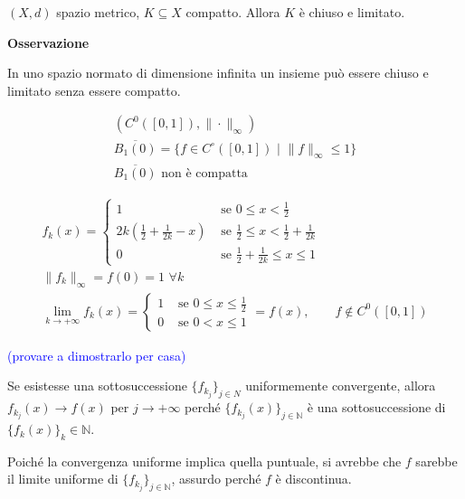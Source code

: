 \begin{theorem}
	\label{th: pag 221}
	$(X,d)$ spazio metrico, $K \subseteq X$ compatto. Allora $K$ è chiuso e limitato.
\end{theorem}
	
	
\textbf{Osservazione}

In uno spazio normato di dimensione infinita un insieme può essere chiuso e limitato senza essere compatto.

\begin{gather*} 
	(C^0([0,1]),\|\cdot\|_\infty)
	\\
	\overline{B_1(0)}=\{f\in C^\circ ([0,1])\,\, \big|\,\, \|f\|_\infty\leq 1\}
	\\
	\overline{B_1(0)} \text{ non è compatta}
\end{gather*}

\segnaposto %

\begin{gather*} 
	f_k(x)=
	\begin{cases}
		1 & \text{ se } 0\leq x <\frac{1}{2}
		\\
		2k(\frac{1}{2}+\frac{1}{2k}-x) &\text{ se } \frac{1}{2}\leq x <\frac{1}{2}+\frac{1}{2k}
		\\
		0 &\text{ se } \frac{1}{2}+\frac{1}{2k} \leq x \leq 1
	\end{cases}
	\\
	\|f_k\|_\infty=f(0)=1\,\, \forall k
	\\
	\lim_{k \rightarrow +\infty} f_k(x) = 
	\begin{cases}
		1 &\text{ se } 0\leq x \leq \frac{1}{2} 
		\\
		0 &\text{ se } 0 < x \leq 1
	\end{cases} 
	= f(x), \qquad f \notin C^0([0,1])
\end{gather*}

\textcolor{blue}{(provare a dimostrarlo per casa)}

Se esistesse una sottosuccessione $\{f_{k_j}\}_{j\in N}$ uniformemente convergente, allora $f_{k_j}(x)\rightarrow f(x)$ per $j \rightarrow +\infty$ perché $\{f_{k_j}(x)\}_{j\in \mathbb{N}}$ è una sottosuccessione di $\{f_k(x)\}_k\in \mathbb{N}$.

Poiché la convergenza uniforme implica quella puntuale, si avrebbe che $f$ sarebbe il limite uniforme di $\{f_{k_j}\}_{j\in\mathbb{N}}$, assurdo perché $f$ è discontinua. 
	
